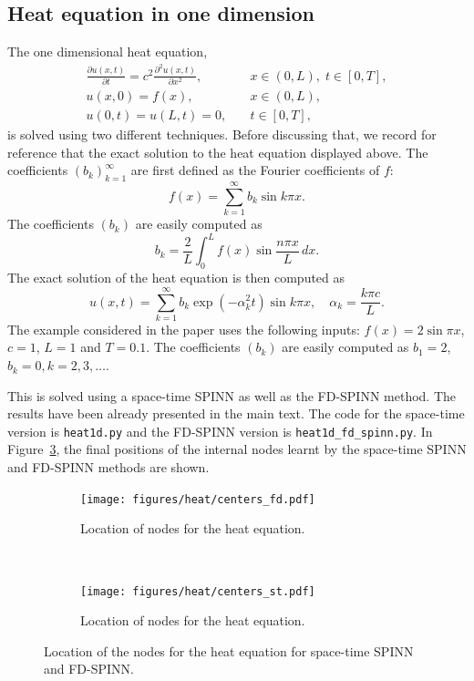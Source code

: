 \documentclass[12pt]{article}
\newcommand{\code}[1]{\lstinline{#1}}
\begin{document}
\subsection{Heat equation in one dimension}
The one dimensional heat equation,
\begin{displaymath}
\begin{split}
\frac{\partial u(x,t)}{\partial t} = c^2\frac{\partial^2 u(x,t)}{\partial x^2},& \quad x \in (0,L), \; t \in [0, T],\\
u(x, 0) = f(x),& \quad x \in (0,L),\\
u(0,t) = u(L,t) = 0,& \quad t \in [0,T],
\end{split}
\end{displaymath}
is solved using two different techniques. Before discussing that, we record for reference that the exact solution to the heat equation displayed above. The coefficients $(b_k)_{k=1}^{\infty}$ are first defined as the Fourier coefficients of $f$:
\begin{displaymath}
f(x) = \sum_{k=1}^{\infty} b_k \sin k\pi x.
\end{displaymath}
The coefficients $(b_k)$ are easily computed as
\begin{displaymath}
b_k = \frac{2}{L}\int_{0}^{L} f(x) \sin \frac{n\pi x}{L}\, dx.
\end{displaymath}
The exact solution of the heat equation is then computed as
\begin{displaymath}
u(x,t) = \sum_{k=1}^{\infty} b_k \exp (-\alpha_k^2 t) \sin k\pi x, \quad \alpha_k = \frac{k\pi c}{L}.
\end{displaymath}
The example considered in the paper uses the following inputs: $f(x) = 2\sin \pi x$, $c = 1$, $L = 1$ and $T = 0.1$. The coefficients $(b_k)$ are easily computed as $b_1 = 2$, $b_k = 0, k = 2, 3, \ldots$.

This is solved using a space-time SPINN as well as the FD-SPINN method. The results have been already presented in the main text. The code for the space-time version is \code{heat1d.py} and the FD-SPINN version is \code{heat1d_fd_spinn.py}.  In Figure~\ref{fig:heat_nodes}, the final positions of the internal nodes learnt by the space-time SPINN and FD-SPINN methods are shown.

\begin{figure}
\begin{subfigure}{0.45\textwidth}
\centering
\texttt{[image: figures/heat/centers\_fd.pdf]}
\caption{Location of nodes for the heat equation.}
\label{fig:heat_fdnodes}
\end{subfigure}
~
\begin{subfigure}{0.45\textwidth}
\centering
\texttt{[image: figures/heat/centers\_st.pdf]}
\caption{Location of nodes for the heat equation.}
\label{fig:heat_st_nodes}
\end{subfigure}
\caption{Location of the nodes for the heat equation for space-time SPINN and FD-SPINN.}
\label{fig:heat_nodes}
\end{figure}
\end{document}
